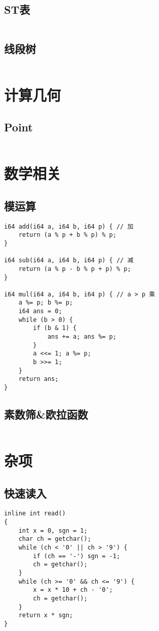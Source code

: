 \documentclass[a4paper, 10pt]{paper}
\newcommand{\cpp}[1]{\inputminted[frame=single, linenos=true]{cpp}{#1}}
\begin{document}
        \subsection{ST表}
        \cpp{../ST.cpp}

        \subsection{线段树}
        \cpp{../SegTree.cpp}

    \section{计算几何}
        \subsection{Point}
        \cpp{../Point.cpp}

    \section{数学相关}
        \subsection{模运算}
        \begin{verbatim}
i64 add(i64 a, i64 b, i64 p) { // 加
    return (a % p + b % p) % p;
}

i64 sub(i64 a, i64 b, i64 p) { // 减
    return (a % p - b % p + p) % p;
}

i64 mul(i64 a, i64 b, i64 p) { // a > p 乘
    a %= p; b %= p;
    i64 ans = 0;
    while (b > 0) {
        if (b & 1) {
            ans += a; ans %= p;
        }
        a <<= 1; a %= p;
        b >>= 1;
    }
    return ans;
}
        \end{verbatim}

        \subsection{素数筛\&欧拉函数}
        \cpp{"../素数筛&欧拉函数.cpp"}

    \section{杂项}
        \subsection{快速读入}
        \begin{verbatim}
inline int read()
{
    int x = 0, sgn = 1;
    char ch = getchar();
    while (ch < '0' || ch > '9') {
        if (ch == '-') sgn = -1;
        ch = getchar();
    }
    while (ch >= '0' && ch <= '9') {
        x = x * 10 + ch - '0';
        ch = getchar();
    }
    return x * sgn;
}
        \end{verbatim}
\end{document}
